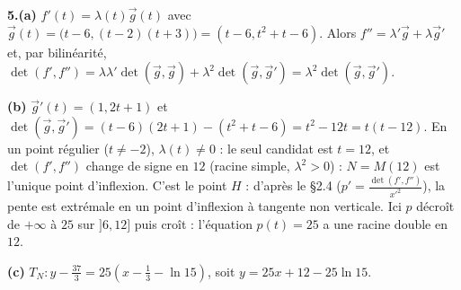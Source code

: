 \documentclass[a4paper,11pt]{article}
\numberwithin{equation}{section}
\numberwithin{figure}{section}
\numberwithin{table}{section}
\theoremstyle{enonce}
\theoremstyle{exemple}
\theoremstyle{remarque}
\newcommand{\ve}[1]{\vec{#1}}
\begin{document}
\textbf{5.(a)} $f'(t)=\lambda(t)\ve g(t)$ avec $\ve g(t)=\big(t-6,(t-2)(t+3)\big)=(t-6,t^2+t-6)$. Alors
$f''=\lambda'\ve g+\lambda\ve g'$ et, par bilinéarité, $\det(f',f'')=\lambda\lambda'\det(\ve g,\ve g)+\lambda^2\det(\ve g,\ve g')=\lambda^2\det(\ve g,\ve g')$.

\textbf{(b)} $\ve g'(t)=(1,2t+1)$ et $\det(\ve g,\ve g')=(t-6)(2t+1)-(t^2+t-6)=t^2-12t=t(t-12)$. En un point régulier
($t\neq-2$), $\lambda(t)\neq0$ : le seul candidat est $t=12$, et $\det(f',f'')$ change de signe en $12$ (racine simple, $\lambda^2>0$) :
$N=M(12)$ est l'unique point d'inflexion. C'est le point $H$ : d'après le \S2.4 ($p'=\frac{\det(f',f'')}{x'^2}$), la pente est extrémale en un
point d'inflexion à tangente non verticale. Ici $p$ décroît de $+\infty$ à $25$ sur $]6,12]$ puis croît : l'équation $p(t)=25$ a une
racine double en $12$.

\textbf{(c)} $T_N:y-\frac{37}3=25\left(x-\frac13-\ln15\right)$, soit $y=25x+12-25\ln15$.
\end{document}
